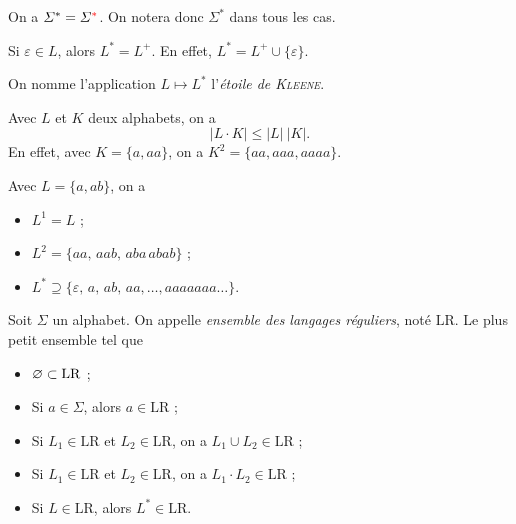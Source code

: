 \begin{rmk}
	On a $\varSigma^* = \varSigma^{{\color{red}*}}$. On notera donc $\Sigma^*$\/ dans tous les cas.
\end{rmk}

\begin{rmk}
	Si $\varepsilon \in L$, alors $L^* = L^+$. En effet, $L^* = L^+ \cup \{\varepsilon\}$.
\end{rmk}

\begin{rmk}
	On nomme l'application $L \mapsto L^*$\/ l'\textit{étoile de \textsc{Kleene}}.
\end{rmk}

\begin{rmk}
	Avec $L$\/ et $K$\/ deux alphabets, on a \[|L\cdot K| \le |L|\:|K|.\]
	En effet, avec $K = \{a,aa\}$, on a $K^2 = \{aa, aaa, aaaa\}$.
\end{rmk}

\begin{exm}
	Avec $L = \{a, ab\}$, on a
	\begin{itemize}
		\item $L^1 = L$\/ ;
		\item $L^2 = \{aa,\,aab,\,aba\,abab\}$\/ ;
		\item $L^* \supseteq \{\varepsilon,\,a,\,ab,\,aa,\ldots,aaaaaaa\ldots\}$.
	\end{itemize}
\end{exm}

\begin{defn}
	Soit $\Sigma$\/ un alphabet.
	On appelle {\it ensemble des langages réguliers}, noté $\mathrm{LR}$. 
	Le plus petit ensemble tel que 
	\begin{itemize}
		\item $\varnothing \subset \mathrm{LR}$\/ ;
		\item Si $a \in \Sigma$, alors $a \in \mathrm{LR}$\/ ;
		\item Si $L_1 \in \mathrm{LR}$\/ et $L_2 \in \mathrm{LR}$, on a $L_1 \cup L_2 \in \mathrm{LR}$\/ ;
		\item Si $L_1 \in \mathrm{LR}$\/ et $L_2 \in \mathrm{LR}$, on a $L_1 \cdot L_2 \in \mathrm{LR}$\/ ;
		\item Si $L \in \mathrm{LR}$, alors $L^* \in \mathrm{LR}$.
	\end{itemize}
\end{defn}

